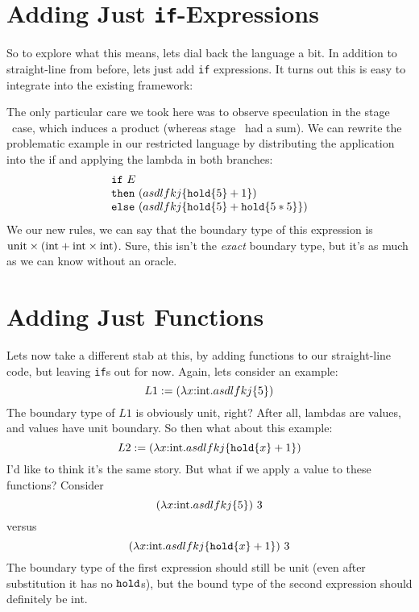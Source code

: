 \documentclass[]{article}
\newcommand {\next}{asdlfkj}
\begin{document}
\section{Adding Just \texttt{if}-Expressions}

So to explore what this means, lets dial back the language a bit.  
In addition to straight-line from before, lets just add \texttt{if} expressions.
It turns out this is easy to integrate into the existing framework:


The only particular care we took here was to observe speculation in the stage \bbtwo\ case,
which induces a product (whereas stage \bbone\ had a sum).
We can rewrite the problematic example in our restricted language 
by distributing the application into the if and applying the lambda in both branches:
\[
\tallif {E}
	{(\next\{\pause\{5\}+1\})}
	{(\next\{\pause\{5\}+\pause\{5*5\}\})}
\]
We our new rules, we can say that the boundary type of this expression is
${\rm unit} \times ({\rm int} + {\rm int} \times {\rm int})$.
Sure, this isn't the {\em exact} boundary type, 
but it's as much as we can know without an oracle.

\section{Adding Just Functions}

Lets now take a different stab at this, by adding functions to our straight-line code,
but leaving \texttt{if}s out for now.
Again, lets consider an example:
\[
L1 := (\lam x \rmint {\next\{5\}})
\]
The boundary type of $L1$ is obviously unit, right?
After all, lambdas are values, and values have unit boundary.
So then what about this example:
\[
L2 := (\lam x \rmint {\next\{\pause\{x\}+1\}})
\]
I'd like to think it's the same story.
But what if we apply a value to these functions?
Consider
\[
(\lam x \rmint {\next\{5\}})~3
\]
versus
\[
(\lam x \rmint {\next\{\pause\{x\}+1\}})~3
\]
The boundary type of the first expression should still be unit 
(even after substitution it has no ${\tt hold}$s),
but the bound type of the second expression should definitely be int.
\end{document}
